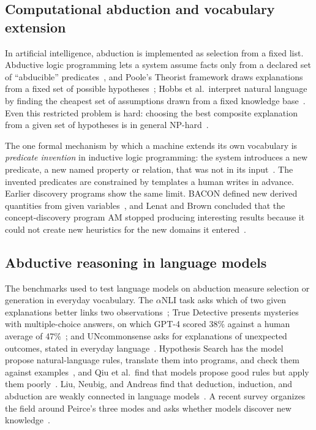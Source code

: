 \documentclass[11pt]{article}
\begin{document}
\subsection{Computational abduction and vocabulary extension}

In artificial intelligence, abduction is implemented as selection from a fixed list. Abductive logic
programming lets a system assume facts only from a declared set of ``abducible''
predicates~\cite{alp}, and Poole's Theorist framework draws explanations from a fixed set of possible
hypotheses~\cite{poole}; Hobbs et al.\ interpret natural language by finding the cheapest set of
assumptions drawn from a fixed knowledge base~\cite{hobbs}. Even this restricted problem is hard: choosing
the best composite explanation from a given set of hypotheses is in general NP-hard~\cite{bylander}.

The one formal mechanism by which a machine extends its own vocabulary is \emph{predicate invention} in
inductive logic programming: the system introduces a new predicate, a new named property or relation,
that was not in its input~\cite{muggleton88,mil}. The invented predicates are constrained by templates a
human writes in advance. Earlier discovery programs show the same limit. BACON defined new derived
quantities from given variables~\cite{bacon}, and Lenat and Brown concluded that the concept-discovery
program AM stopped producing interesting results because it could not create new heuristics for the new
domains it entered~\cite{lenatbrown}.

\subsection{Abductive reasoning in language models}

The benchmarks used to test language models on abduction measure selection or generation in everyday
vocabulary. The $\alpha$NLI task asks which of two given explanations better links two
observations~\cite{anli}; True Detective presents mysteries with multiple-choice answers, on which GPT-4
scored 38\% against a human average of 47\%~\cite{truedetective}; and UNcommonsense asks for
explanations of unexpected outcomes, stated in everyday language~\cite{uncommonsense}. Hypothesis Search has the model propose
natural-language rules, translate them into programs, and check them against examples~\cite{hypsearch},
and Qiu et al.\ find that models propose good rules but apply them poorly~\cite{qiu}. Liu, Neubig, and
Andreas find that deduction, induction, and abduction are weakly connected in language
models~\cite{incomplete}. A recent survey organizes the field around Peirce's three modes and asks
whether models discover new knowledge~\cite{hechen}.
\end{document}
